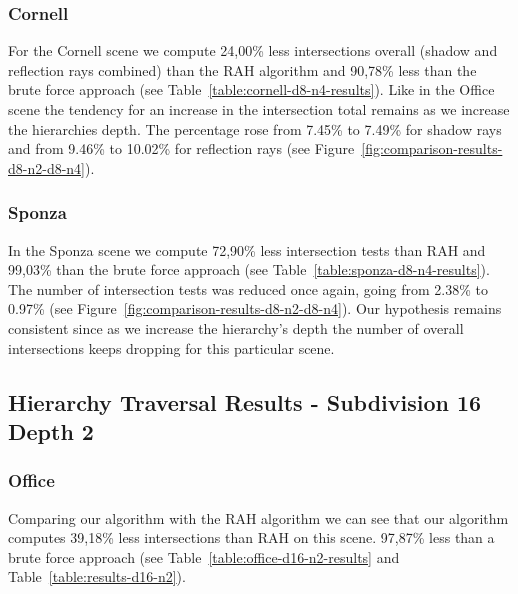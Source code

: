 \subsubsection{Cornell}

For the Cornell scene we compute 24,00\% less intersections overall (shadow and reflection rays combined) than the RAH algorithm and 90,78\% less than the brute force approach (see Table~\ref{table:cornell-d8-n4-results}). Like in the Office scene the tendency for an increase in the intersection total remains as we increase the hierarchies depth. The percentage rose from 7.45\% to 7.49\% for shadow rays and from 9.46\% to 10.02\% for reflection rays (see Figure~\ref{fig:comparison-results-d8-n2-d8-n4}).

\subsubsection{Sponza}

In the Sponza scene we compute 72,90\% less intersection tests than RAH and 99,03\% than the brute force approach (see Table~\ref{table:sponza-d8-n4-results}). The number of intersection tests was reduced once again, going from 2.38\% to 0.97\% (see Figure~\ref{fig:comparison-results-d8-n2-d8-n4}). Our hypothesis remains consistent since as we increase the hierarchy's depth the number of overall intersections keeps dropping for this particular scene.


\pagebreak
\subsection{Hierarchy Traversal Results - Subdivision 16 Depth 2}

\subsubsection{Office}


Comparing our algorithm with the RAH algorithm we can see that our algorithm computes 39,18\% less intersections than RAH on this scene. 97,87\% less than a brute force approach (see Table~\ref{table:office-d16-n2-results} and Table~\ref{table:results-d16-n2}).

    
